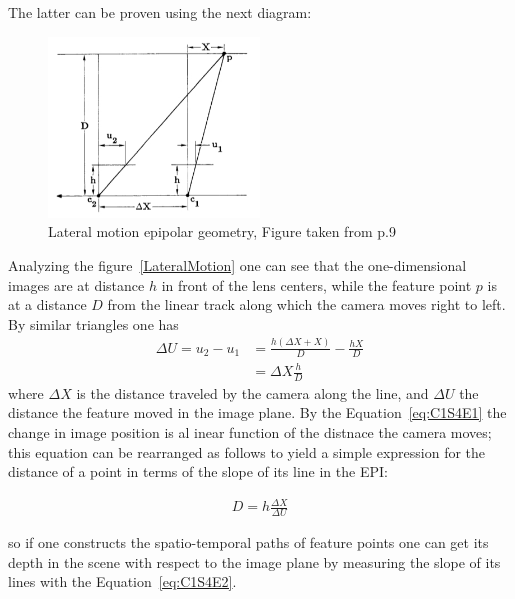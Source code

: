 The latter can be proven using the next diagram:

\begin{figure}[h!]
\centering
\includegraphics[width= 0.50\textwidth]{./Diagrams/stereo-dist.jpg}
\caption{Lateral motion epipolar geometry, Figure taken from \cite{Bolles} p.9}
\label{fig:LateralMotion}
\end{figure}

Analyzing the figure~\ref{LateralMotion} one can see that the one-dimensional images are at distance $h$ in front of the lens centers, while the feature point $p$ is at a distance $D$ from the linear track along which the camera moves right to left. By similar triangles one has
\begin{equation}
\label{eq:C1S4E1}
\begin{aligned}
\Delta U = u_2-u_1 &= \frac{h(\Delta X+X)}{D}-\frac{hX}{D}\\
                   &= \Delta X\frac{h}{D}
\end{aligned}
\end{equation}
where $\Delta X$ is the distance traveled by the camera along the line, and $\Delta U$ the distance the feature moved in the image plane. By the Equation~\ref{eq:C1S4E1} the change in image position is al inear function of the distnace the camera moves; this equation can be rearranged as follows to yield a simple expression for the distance of a point in terms of the slope of its line in the EPI:

\begin{equation}
\label{eq:C1S4E2}
\begin{aligned}
D = h\frac{\Delta X}{\Delta U}
\end{aligned}
\end{equation}

so if one constructs the spatio-temporal paths of feature points one can get its depth in the scene with respect to the image plane by measuring the slope of its lines with the Equation~\ref{eq:C1S4E2}.

